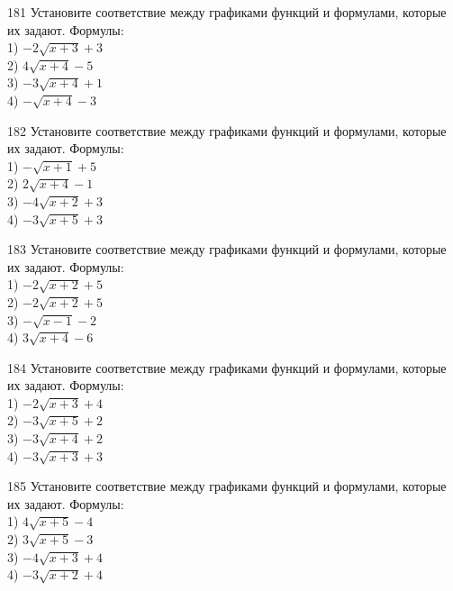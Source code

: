 \documentclass[4apaper]{article}
\begin{document}
\begin{taskBN}{181}
Установите соответствие между графиками функций и формулами, которые их задают. Формулы: \\1) $-2\sqrt{x+3}+3$\\2) $4\sqrt{x+4}-5$\\3) $-3\sqrt{x+4}+1$\\4) $-\sqrt{x+4}-3$
\end{taskBN}

\begin{taskBN}{182}
Установите соответствие между графиками функций и формулами, которые их задают. Формулы: \\1) $-\sqrt{x+1}+5$\\2) $2\sqrt{x+4}-1$\\3) $-4\sqrt{x+2}+3$\\4) $-3\sqrt{x+5}+3$
\end{taskBN}

\begin{taskBN}{183}
Установите соответствие между графиками функций и формулами, которые их задают. Формулы: \\1) $-2\sqrt{x+2}+5$\\2) $-2\sqrt{x+2}+5$\\3) $-\sqrt{x-1}-2$\\4) $3\sqrt{x+4}-6$
\end{taskBN}

\begin{taskBN}{184}
Установите соответствие между графиками функций и формулами, которые их задают. Формулы: \\1) $-2\sqrt{x+3}+4$\\2) $-3\sqrt{x+5}+2$\\3) $-3\sqrt{x+4}+2$\\4) $-3\sqrt{x+3}+3$
\end{taskBN}

\begin{taskBN}{185}
Установите соответствие между графиками функций и формулами, которые их задают. Формулы: \\1) $4\sqrt{x+5}-4$\\2) $3\sqrt{x+5}-3$\\3) $-4\sqrt{x+3}+4$\\4) $-3\sqrt{x+2}+4$
\end{taskBN}
\end{document}
